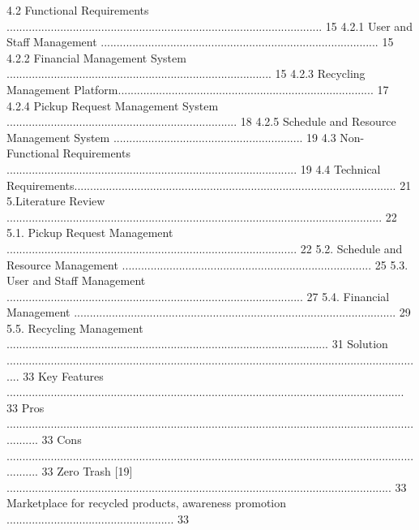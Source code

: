 \documentclass{article}
\begin{document}
4.2 Functional Requirements .................................................................................................... 15 
4.2.1 User and Staff Management ........................................................................................ 15 
4.2.2 Financial Management System .................................................................................... 15 
4.2.3 Recycling Management Platform................................................................................. 17 
4.2.4 Pickup Request Management System ......................................................................... 18 
4.2.5 Schedule and Resource Management System ............................................................ 19 
4.3 Non-Functional Requirements ............................................................................................ 19 
4.4 Technical Requirements...................................................................................................... 21 
5.Literature Review ....................................................................................................................... 22 
5.1. Pickup Request Management ............................................................................................ 22 
5.2. Schedule and Resource Management ............................................................................... 25 
5.3. User and Staff Management .............................................................................................. 27 
5.4. Financial Management ...................................................................................................... 29 
5.5. Recycling Management ...................................................................................................... 31 
Solution ..................................................................................................................................... 33 
Key Features .............................................................................................................................. 33 
Pros ........................................................................................................................................... 33 
Cons ........................................................................................................................................... 33 
Zero Trash [19] .......................................................................................................................... 33 
Marketplace for recycled products, awareness promotion ..................................................... 33 
\end{document}
